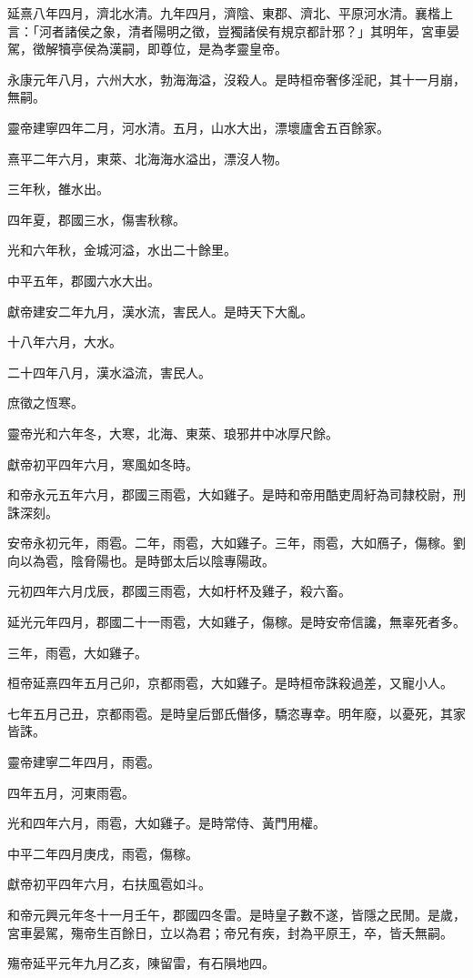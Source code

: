 \begin{pinyinscope}
延熹八年四月，濟北水清。九年四月，濟陰、東郡、濟北、平原河水清。襄楷上言：「河者諸侯之象，清者陽明之徵，豈獨諸侯有規京都計邪？」其明年，宮車晏駕，徵解犢亭侯為漢嗣，即尊位，是為孝靈皇帝。

永康元年八月，六州大水，勃海海溢，沒殺人。是時桓帝奢侈淫祀，其十一月崩，無嗣。

靈帝建寧四年二月，河水清。五月，山水大出，漂壞廬舍五百餘家。

熹平二年六月，東萊、北海海水溢出，漂沒人物。

三年秋，雒水出。

四年夏，郡國三水，傷害秋稼。

光和六年秋，金城河溢，水出二十餘里。

中平五年，郡國六水大出。

獻帝建安二年九月，漢水流，害民人。是時天下大亂。

十八年六月，大水。

二十四年八月，漢水溢流，害民人。

庶徵之恆寒。

靈帝光和六年冬，大寒，北海、東萊、琅邪井中冰厚尺餘。

獻帝初平四年六月，寒風如冬時。

和帝永元五年六月，郡國三雨雹，大如雞子。是時和帝用酷吏周紆為司隸校尉，刑誅深刻。

安帝永初元年，雨雹。二年，雨雹，大如雞子。三年，雨雹，大如鴈子，傷稼。劉向以為雹，陰脅陽也。是時鄧太后以陰專陽政。

元初四年六月戊辰，郡國三雨雹，大如杅杯及雞子，殺六畜。

延光元年四月，郡國二十一雨雹，大如雞子，傷稼。是時安帝信讒，無辜死者多。

三年，雨雹，大如雞子。

桓帝延熹四年五月己卯，京都雨雹，大如雞子。是時桓帝誅殺過差，又寵小人。

七年五月己丑，京都雨雹。是時皇后鄧氏僭侈，驕恣專幸。明年廢，以憂死，其家皆誅。

靈帝建寧二年四月，雨雹。

四年五月，河東雨雹。

光和四年六月，雨雹，大如雞子。是時常侍、黃門用權。

中平二年四月庚戌，雨雹，傷稼。

獻帝初平四年六月，右扶風雹如斗。

和帝元興元年冬十一月壬午，郡國四冬雷。是時皇子數不遂，皆隱之民閒。是歲，宮車晏駕，殤帝生百餘日，立以為君；帝兄有疾，封為平原王，卒，皆夭無嗣。

殤帝延平元年九月乙亥，陳留雷，有石隕地四。


\end{pinyinscope}
